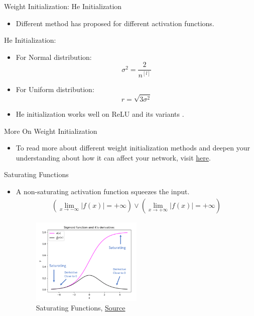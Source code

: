 \documentclass[compress,oilve,t]{beamer}
\newcommand{\tc}[2]{
	\textcolor{#1}{\hspace{-2pt}#2\hspace{-2pt}}
}
\begin{document}
\begin{frame}{Weight Initialization: He Initialization}
	\begin{itemize}
		\item Different method has proposed for different activation functions.
	\end{itemize}
	\begin{block}{He Initialization:}
		\begin{itemize}
			\item For Normal distribution:
			\[
			\sigma^2 = \frac{2}{n^{[l]}}
			\]
			\item For Uniform distribution:
			\[
			r = \sqrt{3\sigma^2}
			\]
		\end{itemize}
	\end{block}
	\begin{itemize}
		\medskip
		\medskip
		\item He initialization works well on \tc{keywords}{ReLU and its variants}.
	\end{itemize}
\end{frame}

\begin{frame}{More On Weight Initialization}
	\begin{itemize}
		\item To read more about different weight initialization methods and deepen your understanding about how it can affect your network, visit \href{https://www.deeplearning.ai/ai-notes/initialization/index.html}{here}. 
	\end{itemize}
\end{frame}

\DeclarePairedDelimiter\abs{\lvert}{\rvert}%
\begin{frame}{Saturating Functions}
	\begin{itemize}
		\item A  \tc{keywords}{non-saturating} activation function squeezes the input.
		\begin{align*}
			(\lim_{x \to -\infty}|f(x)|=+\infty)
			\vee (\lim_{x \to +\infty}|f(x)|=+\infty)
		\end{align*}
		\begin{figure}[H]
			\centering
			\includegraphics[width=0.5\textwidth]{Figs/van_1.png}
			\caption{Saturating Functions, \href{https://www.analyticsvidhya.com/blog/2021/06/the-challenge-of-vanishing-exploding-gradients-in-deep-neural-networks/}{Source}}
		\end{figure}
	\end{itemize}
\end{frame}
\end{document}
